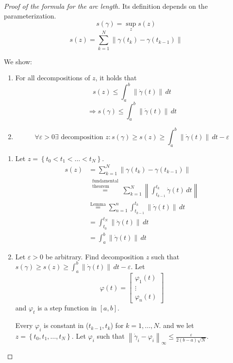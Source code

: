 \documentclass[a4paper,landscape,twocolumn]{article}
\theoremstyle{definition}
\newcommand\set[1]{\left\{#1\right\}}
\newcommand\norm[1]{\left\|#1\right\|}
\newcommand\inorm[1]{\left\|#1\right\|_\infty}
\begin{document}
\begin{proof}[Proof of the formula for the arc length]
  Its definition depends on the parameterization.
  \[ s(\gamma) = \sup_z{s(z)} \]
  \[ s(z) = \sum_{k=1}^N \norm{\gamma(t_k) - \gamma(t_{k-1})} \]

  We show:
  \begin{enumerate}
    \item
      For all decompositions of $z$, it holds that
      \[ s(z) \leq \int_a^b \norm{\dot\gamma(t)} \, dt \]
      \[ \Rightarrow s(\gamma) \leq \int_a^b \norm{\dot\gamma(t)} \, dt \]
    \item
      \[ \forall \varepsilon > 0 \exists \text{ decomposition } z: s(\gamma) \geq s(z) \geq \int_a^b \norm{\dot\gamma(t)} \, dt - \varepsilon \]
  \end{enumerate}

  \begin{enumerate}
    \item Let $z = \set{t_0 < t_1 < \ldots < t_N}$.
      \begin{align*}
        s(z) &= \sum_{k=1}^N \norm{\gamma(t_k) - \gamma(t_{k-1})}  \\
          &\overset{\substack{\text{fundamental} \\ \text{theorem}}}{=}
            \sum_{k=1}^N \norm{\int_{t_{k-1}}^{t_k} \dot\gamma(t) \, dt} \\
          &\overset{\text{Lemma}}{=}
            \sum_{n=1}^n \int_{t_{k-1}}^{t_k} \norm{\dot\gamma(t)} \, dt \\
          &= \int_{t_0}^{t_N} \norm{\dot\gamma(t)} \, dt \\
          &= \int_a^b \norm{\dot\gamma(t)} \, dt
      \end{align*}
    \item Let $\varepsilon > 0$ be arbitrary.
      Find decomposition $z$ such that $s(\gamma) \geq s(z) \geq \int_a^b \norm{\dot\gamma(t)} \, dt - \varepsilon$.
      Let
      \[ \varphi(t) = \begin{bmatrix} \varphi_1(t) \\ \vdots \\ \varphi_n(t) \end{bmatrix} \]
      and $\varphi_t$ is a step function in $[a,b]$.

      Every $\varphi_i$ is constant in ($t_{k-1}, t_k$) for $k=1,\ldots,N$.
      and we let $z = \set{t_0, t_1, \ldots, t_N}$.
      Let $\varphi_i$ such that $\inorm{\dot\gamma_i - \varphi_i} \leq \frac{\varepsilon}{2(b - a) \sqrt{N}}$.


\end{enumerate}
\end{proof}
\end{document}
